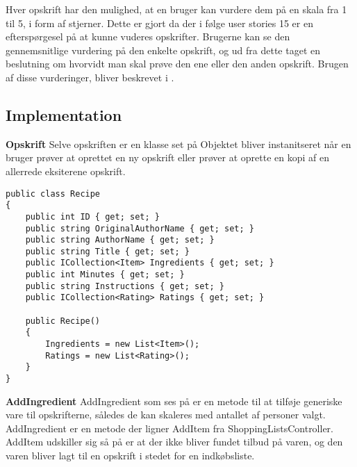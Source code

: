 Hver opskrift har den mulighed, at en bruger kan vurdere dem på en skala fra 1 til 5, i form af stjerner. Dette er gjort da der i følge user stories 15 er en efterspørgesel på at kunne vuderes opskrifter.
Brugerne kan se den gennemsnitlige vurdering på den enkelte opskrift, og ud fra dette taget en beslutning om hvorvidt man skal prøve den ene eller den anden opskrift.
Brugen af disse vurderinger, bliver beskrevet i .


\subsection{Implementation}
\textbf{Opskrift}
Selve opskriften er en klasse set på  Objektet bliver instanitseret når en bruger prøver at oprettet en ny opskrift eller prøver at oprette en kopi af en allerrede eksiterene opskrift.


\begin{lstlisting}[caption="Klassen Recipe som svarer til objektet\, opskrift"]
public class Recipe
{
    public int ID { get; set; }
    public string OriginalAuthorName { get; set; }
    public string AuthorName { get; set; }
    public string Title { get; set; }
    public ICollection<Item> Ingredients { get; set; }
    public int Minutes { get; set; }
    public string Instructions { get; set; }
    public ICollection<Rating> Ratings { get; set; }

    public Recipe()
    {
        Ingredients = new List<Item>();
        Ratings = new List<Rating>();
    }
}
\end{lstlisting}

\textbf{AddIngredient}
AddIngredient som ses på  er en metode til at tilføje generiske vare til opskrifterne, således de kan skaleres med antallet af personer valgt. AddIngredient er en metode der ligner AddItem fra ShoppingListsController. AddItem udskiller sig så på er at der ikke bliver fundet tilbud på varen, og den varen bliver lagt til en opskrift i stedet for en indkøbsliste.



